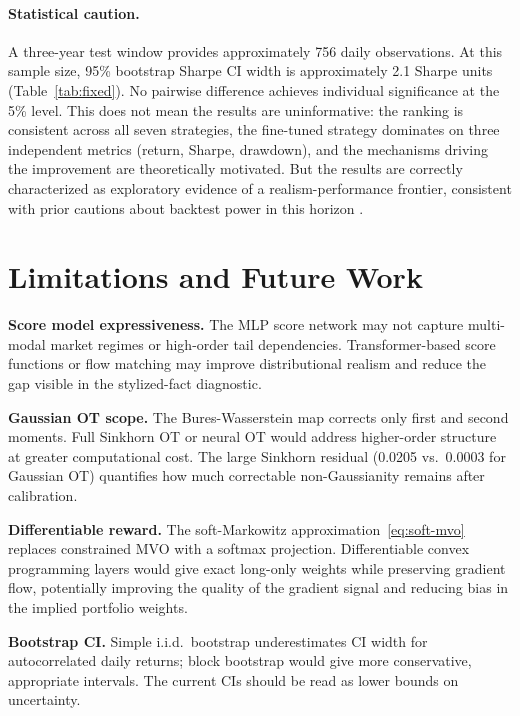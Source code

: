 \documentclass{article}
\begin{document}
\paragraph{Statistical caution.}
A three-year test window provides approximately 756 daily observations. At this
sample size, 95\% bootstrap Sharpe CI width is approximately 2.1 Sharpe units
(Table~\ref{tab:fixed}). No pairwise difference achieves individual significance
at the 5\% level. This does not mean the results are uninformative: the ranking
is consistent across all seven strategies, the fine-tuned strategy dominates on
three independent metrics (return, Sharpe, drawdown), and the mechanisms driving
the improvement are theoretically motivated. But the results are correctly
characterized as exploratory evidence of a realism-performance frontier, consistent
with prior cautions about backtest power in this horizon \citep{bailey2014pseudo}.

\section{Limitations and Future Work}
\label{sec:limitations}

\textbf{Score model expressiveness.} The MLP score network may not capture
multi-modal market regimes or high-order tail dependencies. Transformer-based score
functions \citep{dhariwal2021diffusion} or flow matching \citep{lipman2023flow}
may improve distributional realism and reduce the gap visible in the stylized-fact
diagnostic.

\textbf{Gaussian OT scope.} The Bures-Wasserstein map corrects only first and
second moments. Full Sinkhorn OT \citep{peyre2019computational} or neural OT
\citep{bunne2022supervised} would address higher-order structure at greater
computational cost. The large Sinkhorn residual (0.0205 vs.\ 0.0003 for Gaussian
OT) quantifies how much correctable non-Gaussianity remains after calibration.

\textbf{Differentiable reward.} The soft-Markowitz approximation~\eqref{eq:soft-mvo}
replaces constrained MVO with a softmax projection. Differentiable convex
programming layers \citep{agrawal2019differentiable} would give exact long-only
weights while preserving gradient flow, potentially improving the quality of the
gradient signal and reducing bias in the implied portfolio weights.

\textbf{Bootstrap CI.} Simple i.i.d.\ bootstrap underestimates CI width for
autocorrelated daily returns; block bootstrap \citep{politis1994stationary} would
give more conservative, appropriate intervals. The current CIs should be read as
lower bounds on uncertainty.
\end{document}
